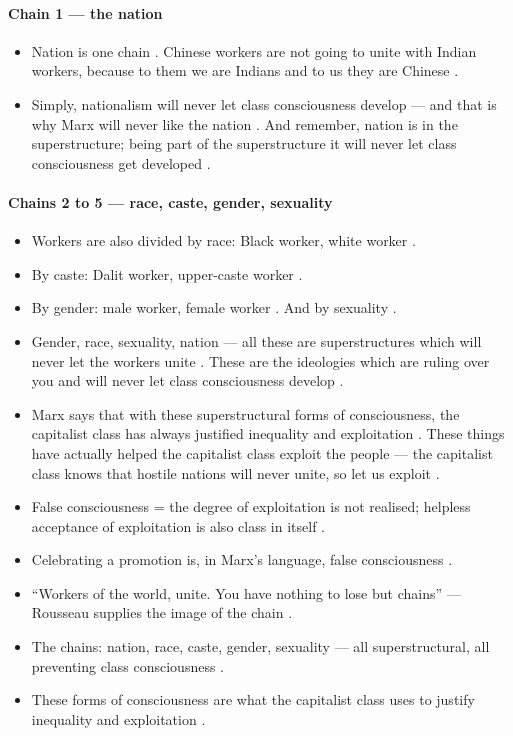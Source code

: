 \paragraph{Chain 1 --- the nation}
\begin{itemize}
    \item Nation is one chain . Chinese workers are not going to unite with Indian workers, because to them we are Indians and to us they are Chinese .
    \item Simply, nationalism will never let class consciousness develop --- and that is why Marx will never like the nation . And remember, nation is in the superstructure; being part of the superstructure it will never let class consciousness get developed .
\end{itemize}

\paragraph{Chains 2 to 5 --- race, caste, gender, sexuality}
\begin{itemize}
    \item Workers are also divided by race: Black worker, white worker .
    \item By caste: Dalit worker, upper-caste worker .
    \item By gender: male worker, female worker . And by sexuality .
    \item Gender, race, sexuality, nation --- all these are superstructures which will never let the workers unite . These are the ideologies which are ruling over you and will never let class consciousness develop .
    \item Marx says that with these superstructural forms of consciousness, the capitalist class has always justified inequality and exploitation . These things have actually helped the capitalist class exploit the people --- the capitalist class knows that hostile nations will never unite, so let us exploit .
\end{itemize}

\begin{QuickRevision}
\begin{itemize}
    \item False consciousness = the degree of exploitation is not realised; helpless acceptance of exploitation is also class in itself .
    \item Celebrating a promotion is, in Marx's language, false consciousness .
    \item ``Workers of the world, unite. You have nothing to lose but chains'' --- Rousseau supplies the image of the chain .
    \item The chains: nation, race, caste, gender, sexuality --- all superstructural, all preventing class consciousness .
    \item These forms of consciousness are what the capitalist class uses to justify inequality and exploitation .
\end{itemize}
\end{QuickRevision}

